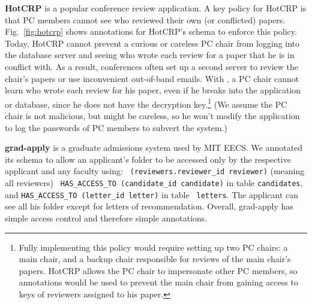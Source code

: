 
{\bf HotCRP} is a popular conference review application.  A key policy
for HotCRP is that PC members cannot see who reviewed their own (or
conflicted) papers.  Fig.~\ref{fig:hotcrp} shows \name annotations for
HotCRP's schema to enforce this policy.  Today, HotCRP cannot prevent
a curious or careless PC chair from logging into the database server
and seeing who wrote each review for a paper that he is in conflict
with.  As a result, conferences often set up a second server to review
the chair's papers or use inconvenient out-of-band emails.  With
\name, a PC chair cannot learn who wrote each review for his paper,
even if he breaks into the application or database, since he does not
have the decryption key.\footnote{Fully implementing this policy would
  require setting up two PC chairs: a main chair, and a backup chair
  responsible for reviews of the main chair's papers.  HotCRP allows
  the PC chair to impersonate other PC members, so \name annotations
  would be used to prevent the main chair from gaining access to keys
  of reviewers assigned to his paper.} (We assume the PC chair is not
malicious, but might be careless, so he won't modify the application
to log the passwords of PC members to subvert the system.)


{\bf grad-apply} is a graduate admissions system used by MIT EECS\@.
We annotated its schema to allow an applicant's folder to be accessed
only by the respective applicant and any faculty using: {\tt \small
(reviewers.reviewer\_id reviewer)} (meaning all reviewers) {\tt \small
HAS\_ACCESS\_TO (candidate\_id candidate)} in table {\tt candidates},
and {\tt \small HAS\_ACCESS\_TO (letter\_id letter)} in table {\tt
letters}. The applicant can see all his folder except for letters
of recommendation.  Overall, grad-apply has simple access control and
therefore simple annotations.


